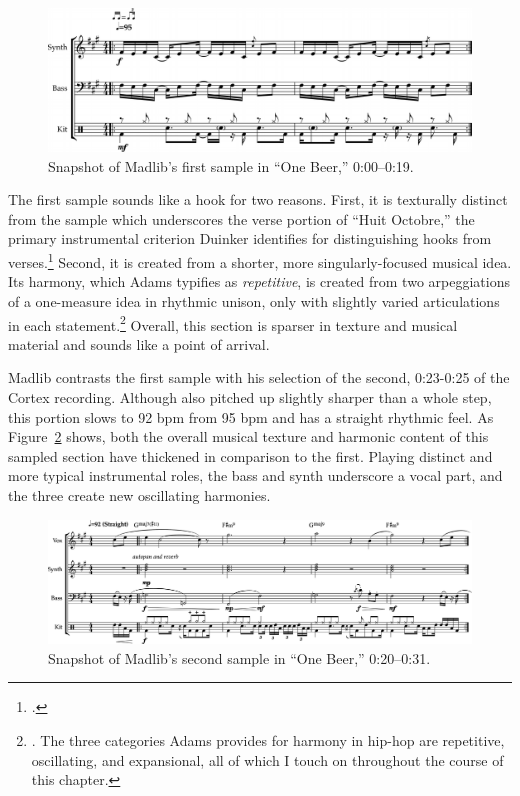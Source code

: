     \begin{figure}[ht]
        \centering
        \includegraphics[width=\textwidth]{images/figures/chp 02/000019onebeerintro.pdf}
        \caption{Snapshot of Madlib's first sample in ``One Beer,'' 0:00--0:19.}
        \label{fig:onebeerintro}
    \end{figure}

The first sample sounds like a hook for two reasons. First, it is texturally distinct from
the sample  which underscores the verse portion of ``Huit Octobre,'' the primary instrumental
criterion Duinker identifies for distinguishing hooks from verses.\footnote{
    \autocite[99]{benduinkerSongFormMainstreaming2020}.}
Second, it is created from a shorter, more singularly-focused musical idea. Its harmony, which
Adams  typifies as \emph{repetitive}, is created from two arpeggiations of a one-measure idea
in rhythmic unison, only with slightly varied articulations in each statement.\footnote{
    \cite{kyleadamsHarmonicSyntacticMotivic2020}. The three categories Adams provides for 
    harmony in hip-hop are repetitive, oscillating, and expansional, all of which I touch on
    throughout the course of this chapter.} 
Overall, this section is sparser in texture and musical material and sounds like a point of
arrival.

Madlib contrasts the first sample with his selection of the second, 0:23-0:25 of the Cortex
recording. Although also pitched up slightly sharper than a whole step, this portion slows 
to 92 bpm from 95 bpm  and has a straight rhythmic feel. As Figure~\ref{fig:onebeermain} 
shows, both the overall musical texture and harmonic content of this sampled section have 
thickened in comparison to the first. Playing distinct and more typical instrumental roles,
the bass and synth underscore a vocal part, and the three create new oscillating harmonies.

    \begin{figure}[ht]
        \centering
        \includegraphics[width=\textwidth]{images/figures/chp 02/020031onebeermain.pdf}
        \caption{Snapshot of Madlib's second sample in ``One Beer,'' 0:20--0:31.}
        \label{fig:onebeermain}
    \end{figure}


